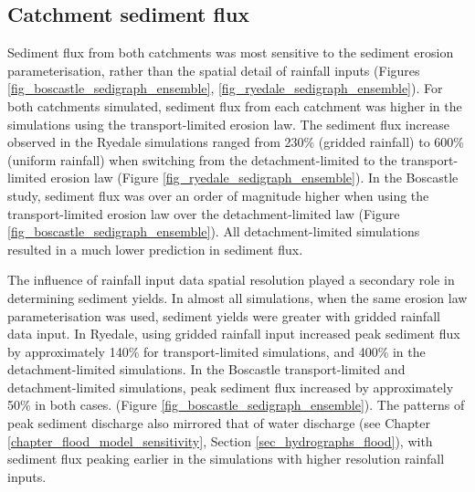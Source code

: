 \subsection{Catchment sediment flux}
Sediment flux from both catchments was most sensitive to the sediment erosion parameterisation, rather than the spatial detail of rainfall inputs (Figures \ref{fig_boscastle_sedigraph_ensemble}, \ref{fig_ryedale_sedigraph_ensemble}). For both catchments simulated, sediment flux from each catchment was higher in the simulations using the transport-limited erosion law. The sediment flux increase observed in the Ryedale simulations ranged from 230\% (gridded rainfall) to 600\% (uniform rainfall) when switching from the detachment-limited to the transport-limited erosion law (Figure \ref{fig_ryedale_sedigraph_ensemble}). In the Boscastle study, sediment flux was over an order of magnitude higher when using the transport-limited erosion law over the detachment-limited law (Figure \ref{fig_boscastle_sedigraph_ensemble}). All detachment-limited simulations resulted in a much lower prediction in sediment flux.

The influence of rainfall input data spatial resolution played a secondary role in determining sediment yields. In almost all simulations, when the same erosion law parameterisation was used, sediment yields were greater with gridded rainfall data input. In Ryedale, using gridded rainfall input increased peak sediment flux by approximately 140\% for transport-limited simulations, and 400\% in the detachment-limited simulations. In the Boscastle transport-limited and detachment-limited simulations, peak sediment flux increased by approximately 50\% in both cases. (Figure \ref{fig_boscastle_sedigraph_ensemble}). The patterns of peak sediment discharge also mirrored that of water discharge (see Chapter \ref{chapter_flood_model_sensitivity}, Section \ref{sec_hydrographs_flood}), with sediment flux peaking earlier in the simulations with higher resolution rainfall inputs. 

